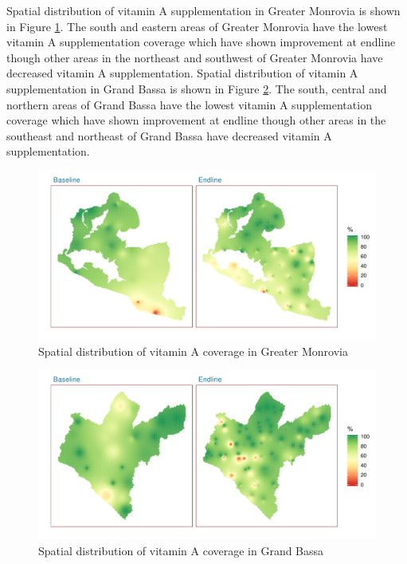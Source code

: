 \documentclass[12pt,a4paper]{article}
\begin{document}
Spatial distribution of vitamin A supplementation in Greater Monrovia is shown in Figure \ref{fig:vit1map}. The south and eastern areas of Greater Monrovia have the lowest vitamin A supplementation coverage which have shown improvement at endline though other areas in the northeast and southwest of Greater Monrovia have decreased vitamin A supplementation. Spatial distribution of vitamin A supplementation in Grand Bassa is shown in Figure \ref{fig:vit2map}. The south, central and northern areas of Grand Bassa have the lowest vitamin A supplementation coverage which have shown improvement at endline though other areas in the southeast and northeast of Grand Bassa have decreased vitamin A supplementation.

\begin{figure}[H]

{\centering \includegraphics{liberiaCoverageFinalReport_files/figure-latex/vit1map-1} 

}

\caption{Spatial distribution of vitamin A coverage in Greater Monrovia}\label{fig:vit1map}
\end{figure}

\begin{figure}[H]

{\centering \includegraphics{liberiaCoverageFinalReport_files/figure-latex/vit2map-1} 

}

\caption{Spatial distribution of vitamin A coverage in Grand Bassa}\label{fig:vit2map}
\end{figure}
\end{document}
